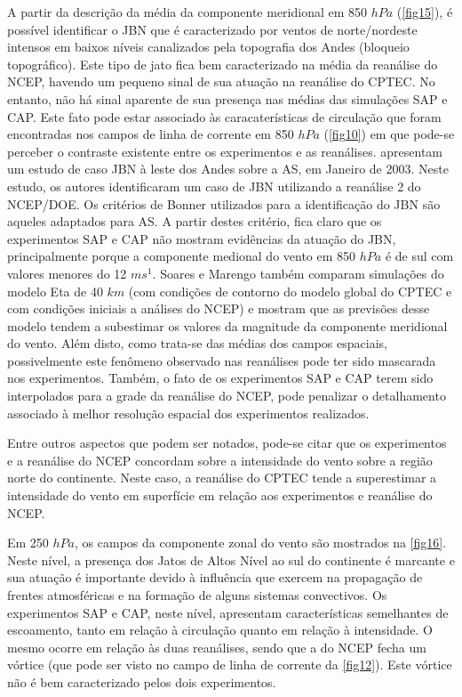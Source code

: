 A partir da descrição da média da componente meridional em 850 $hPa$ (\autoref{fig15}), é possível identificar o JBN que é caracterizado por ventos de norte/nordeste intensos em baixos níveis canalizados pela topografia dos Andes (bloqueio topográfico). Este tipo de jato fica bem caracterizado na média da reanálise do NCEP, havendo um pequeno sinal de sua atuação na reanálise do CPTEC. No entanto, não há sinal aparente de sua presença nas médias das simulações SAP e CAP. Este fato pode estar associado às caracaterísticas de circulação que foram encontradas nos campos de linha de corrente em 850 $hPa$ (\autoref{fig10}) em que pode-se perceber o contraste existente entre os experimentos e as reanálises.  apresentam um estudo de caso JBN à leste dos Andes sobre a AS, em Janeiro de 2003. Neste estudo, os autores identificaram um caso de JBN utilizando a reanálise 2 do NCEP/DOE. Os critérios de Bonner utilizados para a identificação do JBN são aqueles adaptados para AS. A partir destes critério, fica claro que os experimentos SAP e CAP não mostram evidências da atuação do JBN, principalmente porque a componente medional do vento em 850 $hPa$ é de sul com valores menores do 12 $ms^{1}$. Soares e Marengo também comparam simulações do modelo Eta de 40 $km$ (com condições de contorno do modelo global do CPTEC e com condições iniciais a análises do NCEP) e mostram que as previsões desse modelo tendem a subestimar os valores da magnitude da componente meridional do vento. Além disto, como trata-se das médias dos campos espaciais, possivelmente este fenômeno observado nas reanálises pode ter sido mascarada nos experimentos. Também, o fato de os experimentos SAP e CAP terem sido interpolados para a grade da reanálise do NCEP, pode penalizar o detalhamento associado à melhor resolução espacial dos experimentos realizados.

Entre outros aspectos que podem ser notados, pode-se citar que os experimentos e a reanálise do NCEP concordam sobre a intensidade do vento sobre a região norte do continente. Neste caso, a reanálise do CPTEC tende a superestimar a intensidade do vento em superfície em relação aos experimentos e reanálise do NCEP. 



Em 250 $hPa$, os campos da componente zonal do vento são mostrados na \autoref{fig16}. Neste nível, a presença dos Jatos de Altos Nível ao sul do continente é marcante e sua atuação é importante devido à influência que exercem na propagação de frentes atmosféricas e na formação de alguns sistemas convectivos. Os experimentos SAP e CAP, neste nível, apresentam características semelhantes de escoamento, tanto em relação à circulação quanto em relação à intensidade. O mesmo ocorre em relação às duas reanálises, sendo que a do NCEP fecha um vórtice (que pode ser visto no campo de linha de corrente da \autoref{fig12}). Este vórtice não é bem caracterizado pelos dois experimentos. 

